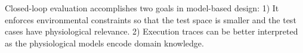 Closed-loop evaluation accomplishes two goals in model-based design: 1) It enforces environmental constraints so that the test space is smaller and the test cases have physiological relevance. 2) Execution traces can be better interpreted as the physiological models encode domain knowledge. 

